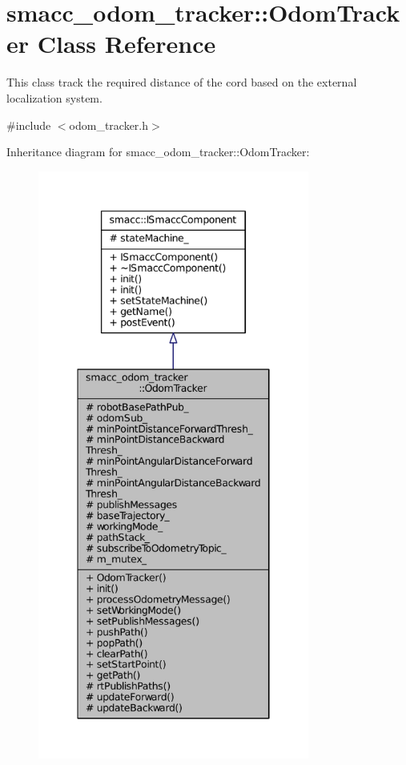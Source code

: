 \hypertarget{classsmacc__odom__tracker_1_1OdomTracker}{}\section{smacc\+\_\+odom\+\_\+tracker\+:\+:Odom\+Tracker Class Reference}
\label{classsmacc__odom__tracker_1_1OdomTracker}


This class track the required distance of the cord based on the external localization system.  




{\ttfamily \#include $<$odom\+\_\+tracker.\+h$>$}



Inheritance diagram for smacc\+\_\+odom\+\_\+tracker\+:\+:Odom\+Tracker\+:
\nopagebreak
\begin{figure}[H]
\begin{center}
\leavevmode
\includegraphics[height=550pt]{classsmacc__odom__tracker_1_1OdomTracker__inherit__graph}
\end{center}
\end{figure}


